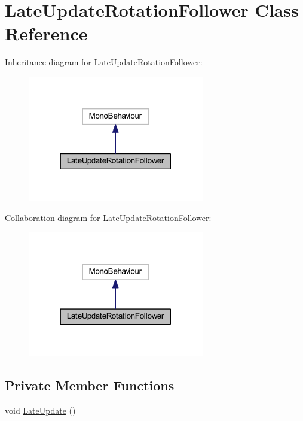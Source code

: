 \hypertarget{class_late_update_rotation_follower}{}\section{Late\+Update\+Rotation\+Follower Class Reference}
\label{class_late_update_rotation_follower}


Inheritance diagram for Late\+Update\+Rotation\+Follower\+:
\nopagebreak
\begin{figure}[H]
\begin{center}
\leavevmode
\includegraphics[width=218pt]{class_late_update_rotation_follower__inherit__graph}
\end{center}
\end{figure}


Collaboration diagram for Late\+Update\+Rotation\+Follower\+:
\nopagebreak
\begin{figure}[H]
\begin{center}
\leavevmode
\includegraphics[width=218pt]{class_late_update_rotation_follower__coll__graph}
\end{center}
\end{figure}
\subsection*{Private Member Functions}
\begin{DoxyCompactItemize}
\item 
void \mbox{\hyperlink{class_late_update_rotation_follower_a038bf88fd7c04d016cd03292e2e7a180}{Late\+Update}} ()
\end{DoxyCompactItemize}
